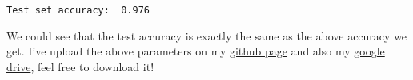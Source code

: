 \documentclass[11pt]{article}
\begin{document}
    \begin{Verbatim}[commandchars=\\\{\}]
Test set accuracy:  0.976
    \end{Verbatim}

    We could see that the test accuracy is exactly the same as the above
accuracy we get. I've upload the above parameters on my
\href{https://github.com/Cypher30/Computer_Vision}{github page} and also
my
\href{https://drive.google.com/file/d/15PUQp7SiCM7XBbJfEnFF_Mt8fjnPOOTp/view?usp=sharing}{google
drive}, feel free to download it!


    
    
    
\end{document}

